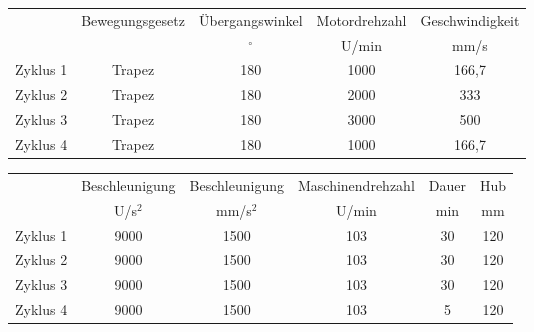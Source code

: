 





\begin{tabular}{ccccc}\toprule
 & Bewegungsgesetz & Übergangswinkel & Motordrehzahl & Geschwindigkeit  \\
 & & $^\circ$ & U/min & mm/s  \\
\midrule
Zyklus 1 & Trapez & 180 & 1000 & 166,7\\
Zyklus 2 & Trapez & 180 & 2000 & 333 \\
Zyklus 3 & Trapez & 180 & 3000 & 500 \\
Zyklus 4 & Trapez & 180 & 1000 & 166,7 \\
\bottomrule
\end{tabular}

\smallskip

\begin{tabular}{cccccc}
 & Beschleunigung & Beschleunigung & Maschinendrehzahl &  Dauer & Hub \\
 & U/s$^2$ & mm/s$^2$ & U/min & min & mm \\
\midrule
Zyklus 1 & 9000 & 1500 & 103 & 30 & 120 \\
Zyklus 2 & 9000 & 1500 & 103 & 30 & 120 \\
Zyklus 3 & 9000 & 1500 & 103 & 30 & 120 \\
Zyklus 4 & 9000 & 1500 & 103 & 5 & 120 \\
\bottomrule
\end{tabular}


